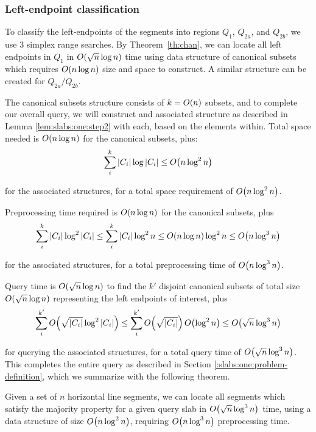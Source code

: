 \subsubsection{Left-endpoint classification}

To classify the left-endpoints of the segments into regions $Q_1$, $Q_{2a}$, and $Q_{2b}$, we use 3 simplex range searches. By Theorem~\ref{th:chan}, we can locate all left endpoints in $Q_1$ in $O\!\left(\sqrt{n}\log{n}\right)$ time using data structure of canonical subsets which requires $O\!\left(n \log{n}\right)$ size and space to construct. A similar structure can be created for $Q_{2a}/Q_{2b}$.

The canonical subsets structure consists of $k = O\!\left(n\right)$ subsets, and to complete our overall query, we will construct and associated structure as described in Lemma \ref{lem:slabs:one:step2} with each, based on the elements within. Total space needed is $O\!\left(n \log{n}\right)$ for the canonical subsets, plus:
\[
\sum_{i}^{k}{|C_i| \log{|C_i|}} \leq O\!\left(n\log^2{n}\right)
\]

\noindent for the associated structures, for a total space requirement of $O\!\left(n\log^2{n}\right)$.

Preprocessing time required is $O\!\left(n \log{n}\right)$ for the canonical subsets, plus
\[
\sum_{i}^{k}{|C_i| \log^2{|C_i|}} 
\leq \sum_{i}^{k}{|C_i| \log^2{n}} 
\leq O\!\left(n\log{n}\right) \log^2{n}
\leq O\!\left(n \log^3{n}\right)
\]

\noindent
for the associated structures, for a total preprocessing time of $O\!\left(n \log^3{n}\right)$.

Query time is $O\!\left(\sqrt{n}\log{n}\right)$ to find the $k'$ disjoint canonical subsets of total size $O\!\left(\sqrt{n}\log{n}\right)$ representing the left endpoints of interest, plus
\[
\sum_{i}^{k'}{O\!\left(\sqrt{|C_i|}\log^2{|C_i|}\right)} 
\leq \sum_{i}^{k'}{O\!\left(\sqrt{|C_i|}\right)O\!\left(\log^2{n}\right)} 
\leq O\!\left(\sqrt{n}\log^3{n}\right)
\]

\noindent
for querying the associated structures, for a total query time of $O\!\left(\sqrt{n} \log^3{n}\right)$. This completes the entire query as described in Section \ref{:slabs:one:problem-definition}, which we summarize with the following theorem.

\begin{theorem}
\label{thm:slabs:one}
Given a set of $n$ horizontal line segments, we can locate all segments which satisfy the majority property for a given query slab in $O\!\left(\sqrt{n}\log^3{n}\right)$ time, using a data structure of size $O\!\left(n\log^2{n}\right)$, requiring $O\!\left(n\log^3{n}\right)$ preprocessing time.
\end{theorem}



